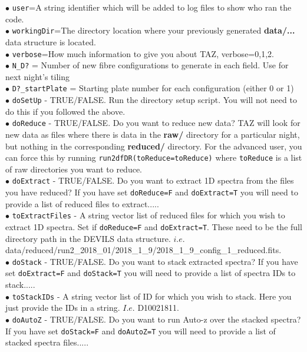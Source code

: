 \documentclass[12pt]{article}
\begin{document}
$\bullet$ \texttt{user}=A string identifier which will be added to log files to show who ran the code. \\
$\bullet$ \texttt{workingDir}=The directory location where your previously generated \textbf{data/...} data structure is located.\\
$\bullet$ \texttt{verbose}=How much information to give you about TAZ,  verbose=0,1,2.\\
$\bullet$ \texttt{N\_D?} = Number of new fibre configurations to generate in each field. Use for next night's tiling\\
$\bullet$ \texttt{D?\_startPlate} = Starting plate number for each configuration (either 0 or 1)\\
$\bullet$ \texttt{doSetUp} - TRUE/FALSE. Run the directory setup script. You will not need to do this if you followed the above.\\
$\bullet$ \texttt{doReduce} - TRUE/FALSE. Do you want to reduce new data? TAZ will look for new data as files where there is data in the \textbf{raw/} directory for a particular night, but nothing in the corresponding \textbf{reduced/} directory. For the advanced user, you can force this by running \texttt{run2dfDR(toReduce=toReduce)} where \texttt{toReduce} is a list of raw directories you want to reduce. \\
$\bullet$ \texttt{doExtract} - TRUE/FALSE. Do you want to extract 1D spectra from the files you have reduced? If you have set \texttt{doReduce=F} and \texttt{doExtract=T} you will need to provide a list of reduced files to extract..... \\
$\bullet$ \texttt{toExtractFiles} - A string vector list of reduced files for which you wish to extract 1D spectra. Set if \texttt{doReduce=F} and \texttt{doExtract=T}. These need to be the full directory path in the DEVILS data structure. $i.e.$ data/reduced/run2\_2018\_01/2018\_1\_9/2018\_1\_9\_config\_1\_reduced.fits. \\
$\bullet$ \texttt{doStack} - TRUE/FALSE. Do you want to stack extracted spectra? If you have set \texttt{doExtract=F} and \texttt{doStack=T} you will need to provide a list of spectra IDs to stack..... \\
$\bullet$ \texttt{toStackIDs} - A string vector list of ID for which you wish to stack. Here you just provide the IDs in a string. $I.e.$ D10021811.\\
$\bullet$ \texttt{doAutoZ} - TRUE/FALSE. Do you want to run Auto-z over the stacked spectra? If you have set \texttt{doStack=F} and \texttt{doAutoZ=T} you will need to provide a list of stacked spectra files..... \\
\end{document}
